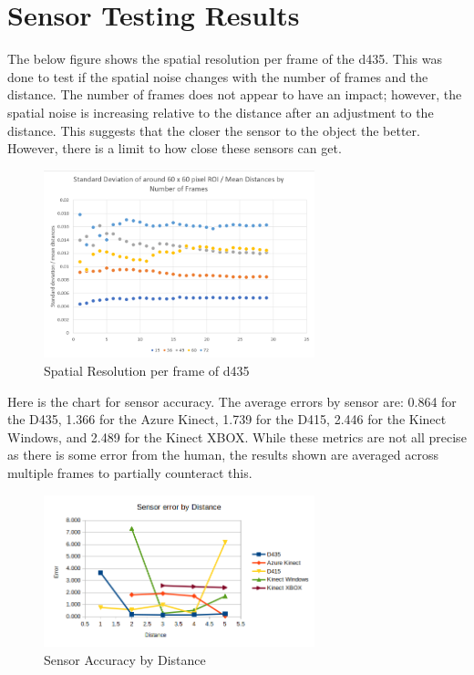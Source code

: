 \section{Sensor Testing Results}
The below figure shows the spatial resolution per frame of the d435. This was done to test if the spatial noise changes with the number of frames and the distance. The number of frames does not appear to have an impact; however, the spatial noise is increasing relative to the distance after an adjustment to the distance. This suggests that the closer the sensor to the object the better. However, there is a limit to how close these sensors can get.
\begin{figure}[!htb]
	\caption{Spatial Resolution per frame of d435}
	\centering
	\includegraphics[width=0.7\textwidth]{images/d435_spatial_resolution.png}
\end{figure}

Here is the chart for sensor accuracy. The average errors by sensor are: 0.864 for the D435, 1.366 for the Azure Kinect, 1.739 for the D415, 2.446 for the Kinect Windows, and 2.489 for the Kinect XBOX. While these metrics are not all precise as there is some error from the human, the results shown are averaged across multiple frames to partially counteract this.
\begin{figure}[!htb]
	\caption{Sensor Accuracy by Distance}
	\centering
	\includegraphics[width=0.7\textwidth]{images/sensor_accuracy.png}
\end{figure}

